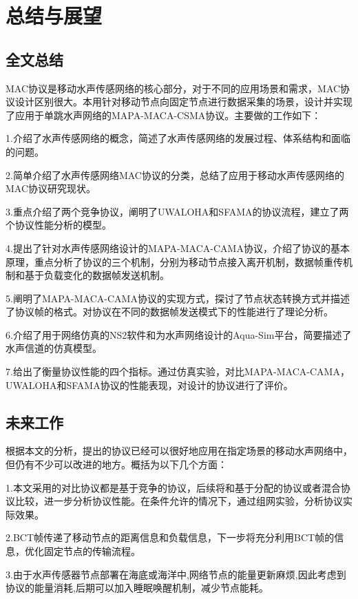 \chapter{总结与展望}
\section {全文总结}
MAC协议是移动水声传感网络的核心部分，对于不同的应用场景和需求，MAC协议设计区别很大。本用针对移动节点向固定节点进行数据采集的场景，设计并实现了应用于单跳水声网络的MAPA-MACA-CSMA协议。主要做的工作如下：

1.介绍了水声传感网络的概念，简述了水声传感网络的发展过程、体系结构和面临的问题。

2.简单介绍了水声传感网络MAC协议的分类，总结了应用于移动水声传感网络的MAC协议研究现状。

3.重点介绍了两个竞争协议，阐明了UWALOHA和SFAMA的协议流程，建立了两个协议性能分析的模型。

4.提出了针对水声传感网络设计的MAPA-MACA-CAMA协议，介绍了协议的基本原理，重点分析了协议的三个机制，分别为移动节点接入离开机制，数据帧重传机制和基于负载变化的数据帧发送机制。

5.阐明了MAPA-MACA-CAMA协议的实现方式，探讨了节点状态转换方式并描述了协议帧的格式。对协议在不同的数据帧发送模式下的性能进行了理论分析。

6.介绍了用于网络仿真的NS2软件和为水声网络设计的Aqua-Sim平台，简要描述了水声信道的仿真模型。

7.给出了衡量协议性能的四个指标。通过仿真实验，对比MAPA-MACA-CAMA，UWALOHA和SFAMA协议的性能表现，对设计的协议进行了评价。

\section {未来工作}
根据本文的分析，提出的协议已经可以很好地应用在指定场景的移动水声网络中，但仍有不少可以改进的地方。概括为以下几个方面：

1.本文采用的对比协议都是基于竞争的协议，后续将和基于分配的协议或者混合协议比较，进一步分析协议性能。在条件允许的情况下，通过组网实验，分析协议实际效果。

2.BCT帧传递了移动节点的距离信息和负载信息，下一步将充分利用BCT帧的信息，优化固定节点的传输流程。

3.由于水声传感器节点部署在海底或海洋中,网络节点的能量更新麻烦,因此考虑到协议的能量消耗,后期可以加入睡眠唤醒机制，减少节点能耗。

\endinput